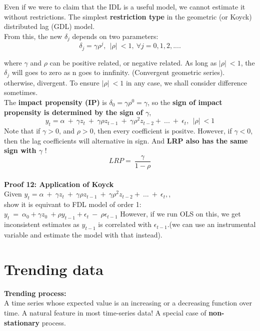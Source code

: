 \documentclass[12pt]{article}
\begin{document}
Even if we were to claim that the IDL is a useful model, we cannot estimate it without restrictions.
The simplest \textbf{restriction type} in the geometric (or Koyck) distributed lag (GDL) model.\\
From this, the new $\delta_j$ depends on two parameters:
\begin{equation}
\delta_j=\gamma\rho^j,\ \ \left|\rho\right|\ <1,\ \forall j = 0,1,2,....
\end{equation}

where $\gamma$ and $\rho$ can be positive related, or negative related. As long as $\left|\rho\right|\ <1$, the $\delta_j$ will goes to zero as n goes to innfinity. (Convergent geometric series). otherwise, divergent. To ensure $\left|\rho\right|\ <1$ in any case, we shall consider difference sometimes. 
\\

The \textbf{impact propensity (IP)} is $\delta_0=\gamma\rho^0 = \gamma$, so the \textbf{sign of impact propensity is determined by the sign of $\gamma$}, 
\begin{equation}
y_t=\alpha\ +\ \gamma z_t\ +\ \gamma\rho z_{t-1}\ +\ \gamma\rho^2z_{t-2}+\ ...\ +\ \epsilon_t,\ \ \left|\rho\right|\ <1
\end{equation}
Note that if $\gamma >0$, and $\rho >0$, then every coefficient is positve. However, if $\gamma < 0$, then the lag coefficients will alternative in sign. And \textbf{LRP also has the same sign with $\gamma$} !
\\
\begin{equation}
LRP =\ \frac{\gamma}{1-\rho}
\end{equation}
\\

\noindent
{\color{Tan} \textbf{Proof 12: Application of Koyck}}\\
Given $y_t=\alpha\ +\ \gamma z_t\ +\ \gamma\rho z_{t-1}\ +\ \gamma\rho^2z_{t-2}+\ ...\ +\ \epsilon_t,$, \\ 
show it is equivant to FDL model of order 1:
$y_t\ =\ \alpha_0+\gamma z_0\ +\rho y_{t-1}+\epsilon_t\ -\ \rho\epsilon_{t-1}$
However, if we run OLS on this, we get inconsistent estimates as $y_{t-1}$ is correlated with $\epsilon_{t-1}$.(we can use an instrumental variable and estimate the model with that instead).


\newpage
{\color{RoyalBlue}
\section{Trending data}}
\noindent
\textbf{Trending process:} \\
A time series whose expected value is an increasing or a decreasing function over time. A natural feature in most time-series data! A special case of \textbf{non-stationary} process.
\\
\end{document}
